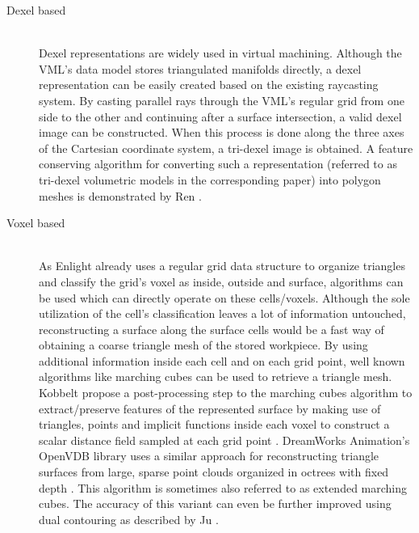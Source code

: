 \begin{description}
		
	\item[Dexel based] \hfill \\
	Dexel representations are widely used in virtual machining.
	Although the VML's data model stores triangulated manifolds directly, a dexel representation can be easily created based on the existing raycasting system.
	By casting parallel rays through the VML's regular grid from one side to the other and continuing after a surface intersection, a valid dexel image can be constructed.
	When this process is done along the three axes of the Cartesian coordinate system, a tri-dexel image is obtained.
	A feature conserving algorithm for converting such a representation (referred to as tri-dexel volumetric models in the corresponding paper) into polygon meshes is demonstrated by Ren \etal \cite{tridexel_reconstruction}.
	
	
	\item[Voxel based] \hfill \\
	As Enlight already uses a regular grid data structure to organize triangles and classify the grid's voxel as inside, outside and surface, algorithms can be used which can directly operate on these cells/voxels.
	Although the sole utilization of the cell's classification leaves a lot of information untouched, reconstructing a surface along the surface cells would be a fast way of obtaining a coarse triangle mesh of the stored workpiece.
	By using additional information inside each cell and on each grid point, well known algorithms like marching cubes can be used to retrieve a triangle mesh.
	Kobbelt \etal propose a post-processing step to the marching cubes algorithm to extract/preserve features of the represented surface by making use of triangles, points and implicit functions inside each voxel to construct a scalar distance field sampled at each grid point \cite{extended_marching_cubes}.
	DreamWorks Animation's OpenVDB library uses a similar approach for reconstructing triangle surfaces from large, sparse point clouds organized in octrees with fixed depth \cite{openvdb}.
	This algorithm is sometimes also referred to as extended marching cubes.
	The accuracy of this variant can even be further improved using dual contouring as described by Ju \etal \cite{dual_contouring}.

\end{description}


